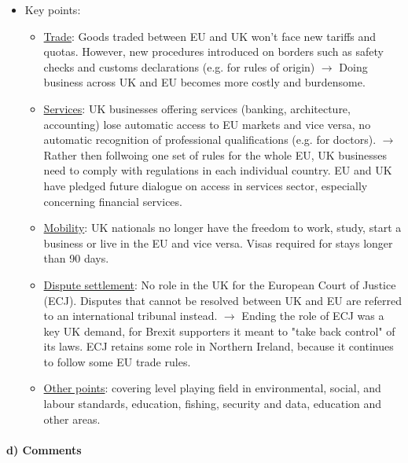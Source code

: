 \begin{itemize}
    \item Key points:
        \begin{itemize}
            \item \underline{Trade}: Goods traded between EU and UK won't face new tariffs
                and quotas. However, new procedures introduced on borders such
                as safety checks and customs declarations (e.g. for rules of
                origin) $\rightarrow$ Doing business across UK and EU becomes
                more costly and burdensome.
            \item \underline{Services}: UK businesses offering services (banking,
                architecture, accounting) lose automatic access to EU markets and
                vice versa, no automatic recognition of professional qualifications
                (e.g. for doctors). $\rightarrow$ Rather then follwoing one set of
                rules for the whole EU, UK businesses need to comply with regulations
                in each individual country. EU and UK have pledged future dialogue
                on access in services sector, especially concerning financial services.
            \item \underline{Mobility}: UK nationals no longer have the freedom to work,
                study, start a business or live in the EU and vice versa. Visas required
                for stays longer than 90 days.
            \item \underline{Dispute settlement}: No role in the UK for the European
                Court of Justice (ECJ). Disputes that cannot be resolved between UK
                and EU are referred to an international tribunal instead.
                $\rightarrow$ Ending the role of ECJ was a key UK demand, for Brexit
                supporters it meant to "take back control" of its laws. ECJ retains
                some role in Northern Ireland, because it continues to follow some
                EU trade rules.
            \item \underline{Other points}: covering level playing field in environmental,
                social, and labour standards, education, fishing, security and data,
                education and other areas.
        \end{itemize}
\end{itemize}

\paragraph{d) Comments}

